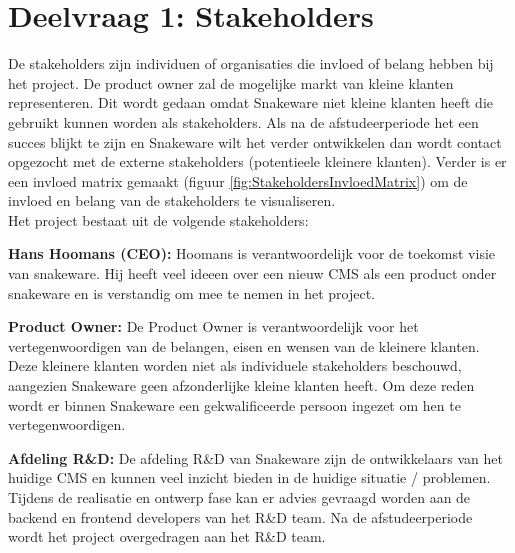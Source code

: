 \section{Deelvraag 1: Stakeholders}
De stakeholders zijn individuen of organisaties die invloed of belang hebben bij het project.
De product owner zal de mogelijke markt van kleine klanten representeren.
Dit wordt gedaan omdat Snakeware niet kleine klanten heeft die gebruikt kunnen worden als stakeholders.
Als na de afstudeerperiode het een succes blijkt te zijn en Snakeware wilt het verder ontwikkelen dan wordt contact opgezocht met de externe stakeholders (potentieele kleinere klanten). 
Verder is er een invloed matrix gemaakt (figuur \ref{fig:StakeholdersInvloedMatrix}) om de invloed en belang van de stakeholders te visualiseren. \\
Het project bestaat uit de volgende stakeholders:

\whitespace
\textbf{Hans Hoomans (CEO):}
Hoomans is verantwoordelijk voor de toekomst visie van snakeware.
Hij heeft veel ideeen over een nieuw \gls{CMS} als een product onder snakeware en is verstandig om mee te nemen in het project.

\whitespace
\textbf{Product Owner:}
De Product Owner is verantwoordelijk voor het vertegenwoordigen van de belangen, eisen en wensen van de kleinere klanten.
Deze kleinere klanten worden niet als individuele stakeholders beschouwd, aangezien Snakeware geen afzonderlijke kleine klanten heeft.
Om deze reden wordt er binnen Snakeware een gekwalificeerde persoon ingezet om hen te vertegenwoordigen.

\whitespace
\textbf{Afdeling R\&D:} De afdeling R\&D van Snakeware zijn de ontwikkelaars van het huidige \gls{CMS} en kunnen veel inzicht bieden in de huidige situatie / problemen.
Tijdens de realisatie en ontwerp fase kan er advies gevraagd worden aan de backend en frontend developers van het R\&D team.
Na de afstudeerperiode wordt het project overgedragen aan het R\&D team.
%
%

